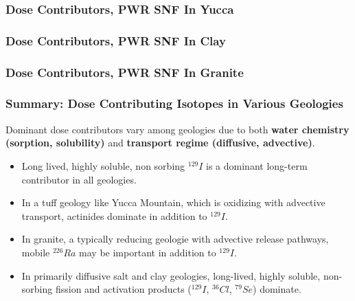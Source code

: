 
\begin{frame}[ctb!]
  \frametitle{Dose Contributors, PWR SNF In Yucca}
\footnotesize{
  
}
\end{frame}

\begin{frame}[ctb!]
  \frametitle{Dose Contributors, PWR SNF In Clay}
\footnotesize{
  
}
\end{frame}

\begin{frame}[ctb!]
  \frametitle{Dose Contributors, PWR SNF In Granite}
\footnotesize{
  
}
\end{frame}

\begin{frame}[ctb!]
  \frametitle{Summary: Dose Contributing Isotopes in Various Geologies}
Dominant dose contributors vary among geologies due to both \textbf{water chemistry (sorption, solubility)} and \textbf{transport regime (diffusive, advective)}. 
\begin{itemize}
  \item Long lived, highly soluble, non sorbing $^{129}I$ is a dominant long-term
contributor in all geologies.
  \item In a tuff geology like Yucca Mountain, which is oxidizing with advective transport, actinides dominate in addition to $^{129}I$.
  \item In granite, a typically reducing geologie with advective release pathways, mobile $^{226}Ra$ may be important in addition to $^{129}I$.
  \item In primarily diffusive salt and clay geologies, long-lived, highly soluble, non-sorbing fission and activation products ($^{129}I$, $^{36}Cl$, $^{79}Se$)  dominate. 
\end{itemize}
\end{frame}
